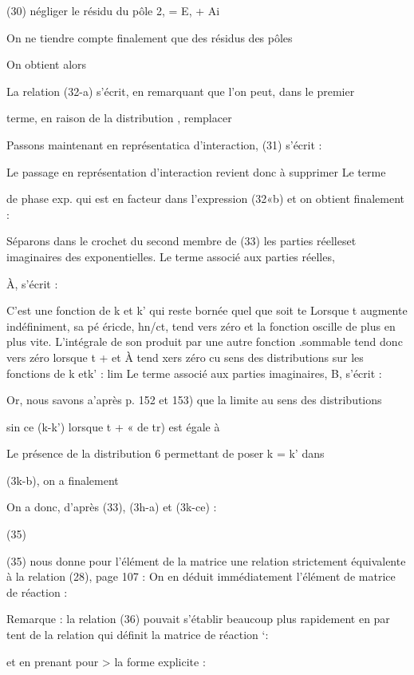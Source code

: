 (30) négliger le résidu du pôle 2, = E, + Ai

 On ne tiendre compte finalement que des résidus des pôles

On obtient alors

La relation (32-a) s'écrit, en remarquant que l'on peut, dans le premier

terme, en raison de la distribution , remplacer


Passons maintenant en représentatica d'interaction, (31) s'écrit :

Le passage en représentation d'interaction revient donc à supprimer Le terme

de phase exp. qui est en facteur dans l'expression (32«b)
et on obtient finalement :



Séparons dans le crochet du second membre de (33) les parties
réelleset imaginaires des exponentielles. Le terme associé aux parties réelles,

À, s'écrit :


C'est une fonction de k et k' qui reste bornée quel que soit te
Lorsque t augmente indéfiniment, sa pé éricde, hn/ct, tend vers zéro et la fonction oscille de plus en plus vite. L'intégrale de son produit par une autre
fonction .sommable tend donc vers zéro lorsque t + et À tend xers zéro cu
sens des distributions sur les fonctions de k etk' :
 lim
Le terme associé aux parties imaginaires, B, s'écrit :

Or, nous savons a'après p. 152 et 153) que la limite au sens des distributions

sin ce (k-k') 
lorsque t + « de tr) est égale à 

Le présence de la distribution 6 permettant de poser k = k' dans

(3k-b), on a finalement


On a donc, d'après (33), (3h-a) et (3k-ce) :



(35) 

(35) nous donne pour l'élément de la matrice  une relation strictement
équivalente à la relation (28), page 107 :
On en déduit immédiatement l'élément de matrice de réaction :


Remarque : la relation (36) pouvait s'établir beaucoup plus rapidement en par
tent de la relation qui définit la matrice de réaction ‘:

et en prenant pour > la forme explicite :

